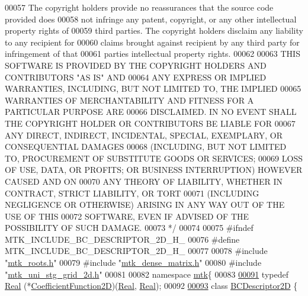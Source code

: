 \begin{DoxyCode}
00057 \textcolor{comment}{The copyright holders provide no reassurances that the source code provided does}
00058 \textcolor{comment}{not infringe any patent, copyright, or any other intellectual property rights of}
00059 \textcolor{comment}{third parties. The copyright holders disclaim any liability to any recipient for}
00060 \textcolor{comment}{claims brought against recipient by any third party for infringement of that}
00061 \textcolor{comment}{parties intellectual property rights.}
00062 \textcolor{comment}{}
00063 \textcolor{comment}{THIS SOFTWARE IS PROVIDED BY THE COPYRIGHT HOLDERS AND CONTRIBUTORS "AS IS" AND}
00064 \textcolor{comment}{ANY EXPRESS OR IMPLIED WARRANTIES, INCLUDING, BUT NOT LIMITED TO, THE IMPLIED}
00065 \textcolor{comment}{WARRANTIES OF MERCHANTABILITY AND FITNESS FOR A PARTICULAR PURPOSE ARE}
00066 \textcolor{comment}{DISCLAIMED. IN NO EVENT SHALL THE COPYRIGHT HOLDER OR CONTRIBUTORS BE LIABLE FOR}
00067 \textcolor{comment}{ANY DIRECT, INDIRECT, INCIDENTAL, SPECIAL, EXEMPLARY, OR CONSEQUENTIAL DAMAGES}
00068 \textcolor{comment}{(INCLUDING, BUT NOT LIMITED TO, PROCUREMENT OF SUBSTITUTE GOODS OR SERVICES;}
00069 \textcolor{comment}{LOSS OF USE, DATA, OR PROFITS; OR BUSINESS INTERRUPTION) HOWEVER CAUSED AND ON}
00070 \textcolor{comment}{ANY THEORY OF LIABILITY, WHETHER IN CONTRACT, STRICT LIABILITY, OR TORT}
00071 \textcolor{comment}{(INCLUDING NEGLIGENCE OR OTHERWISE) ARISING IN ANY WAY OUT OF THE USE OF THIS}
00072 \textcolor{comment}{SOFTWARE, EVEN IF ADVISED OF THE POSSIBILITY OF SUCH DAMAGE.}
00073 \textcolor{comment}{*/}
00074 
00075 \textcolor{preprocessor}{#ifndef MTK\_INCLUDE\_BC\_DESCRIPTOR\_2D\_H\_}
00076 \textcolor{preprocessor}{#define MTK\_INCLUDE\_BC\_DESCRIPTOR\_2D\_H\_}
00077 
00078 \textcolor{preprocessor}{#include "\hyperlink{mtk__roots_8h}{mtk\_roots.h}"}
00079 \textcolor{preprocessor}{#include "\hyperlink{mtk__dense__matrix_8h}{mtk\_dense\_matrix.h}"}
00080 \textcolor{preprocessor}{#include "\hyperlink{mtk__uni__stg__grid__2d_8h}{mtk\_uni\_stg\_grid\_2d.h}"}
00081 
00082 \textcolor{keyword}{namespace }\hyperlink{namespacemtk}{mtk}\{
00083 
\hypertarget{mtk__bc__descriptor__2d_8h_source_l00091}{}\hyperlink{group__c07-mim__ops_ga0322dd5a158c1864242833ec224ee4c1}{00091} \textcolor{keyword}{typedef} \hyperlink{group__c01-roots_gac080bbbf5cbb5502c9f00405f894857d}{Real} (*\hyperlink{group__c07-mim__ops_ga0322dd5a158c1864242833ec224ee4c1}{CoefficientFunction2D})(\hyperlink{group__c01-roots_gac080bbbf5cbb5502c9f00405f894857d}{Real}, \hyperlink{group__c01-roots_gac080bbbf5cbb5502c9f00405f894857d}{Real});
00092 
\hypertarget{mtk__bc__descriptor__2d_8h_source_l00093}{}\hyperlink{classmtk_1_1BCDescriptor2D}{00093} \textcolor{keyword}{class }\hyperlink{classmtk_1_1BCDescriptor2D}{BCDescriptor2D} \{

\end{DoxyCode}
